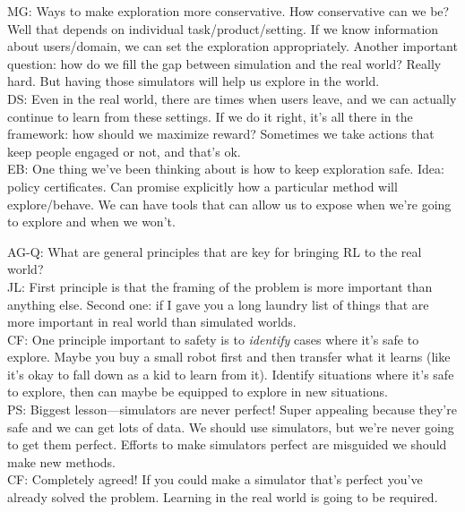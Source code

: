 MG: Ways to make exploration more conservative. How conservative can we be? Well that depends on individual task/product/setting. If we know information about users/domain, we can set the exploration appropriately. Another important question: how do we fill the gap between simulation and the real world? Really hard. But having those simulators will help us explore in the world. \\

DS: Even in the real world, there are times when users leave, and we can actually continue to learn from these settings. If we do it right, it's all there in the framework: how should we maximize reward? Sometimes we take actions that keep people engaged or not, and that's ok. \\

EB: One thing we've been thinking about is how to keep exploration safe. Idea: policy certificates. Can promise explicitly how a particular method will explore/behave. We can have tools that can allow us to expose when we're going to explore and when we won't.

\spacerule

AG-Q: What are general principles that are key for bringing RL to the real world? \\

JL: First principle is that the framing of the problem is more important than anything else. Second one: if I gave you a long laundry list of things that are more important in real world than simulated worlds. \\

CF: One principle important to safety is to {\it identify} cases where it's safe to explore. Maybe you buy a small robot first and then transfer what it learns (like it's okay to fall down as a kid to learn from it). Identify situations where it's safe to explore, then can maybe be equipped to explore in new situations. \\

PS: Biggest lesson---simulators are never perfect! Super appealing because they're safe and we can get lots of data. We should use simulators, but we're never going to get them perfect. Efforts to make simulators perfect are misguided we should make new methods. \\

CF: Completely agreed! If you could make a simulator that's perfect you've already solved the problem. Learning in the real world is going to be required. \\

